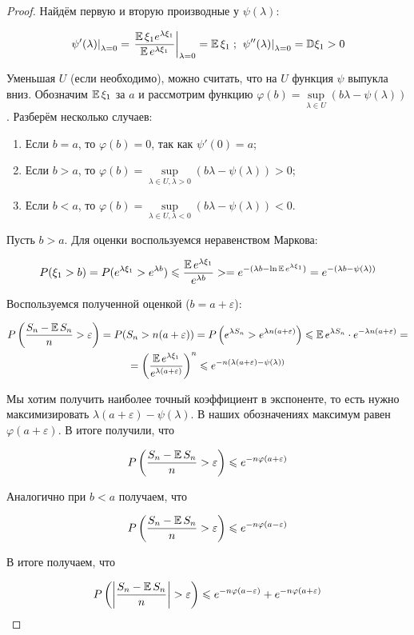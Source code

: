 \begin{proof}
Найдём первую и вторую производные у $\psi(\lambda)$:

\[
\left. \psi'(\lambda) \right|_{\lambda = 0} = 
\left. \frac{\operatorname{\mathbb{E}} \xi_1 e^{\lambda \xi_1}}{\operatorname{\mathbb{E}} e^{\lambda \xi_1}} \right|_{\lambda = 0}
= \operatorname{\mathbb{E}} \xi_1 \; ; \; 
\left. \psi''(\lambda) \right|_{\lambda = 0} = {\mathbb{D}} \xi_1 > 0
\]

Уменьшая $U$ (если необходимо), можно считать, что на $U$ функция $\psi$
выпукла вниз. Обозначим $\operatorname{\mathbb{E}} \xi_1$ за $a$ и рассмотрим функцию
\( \varphi(b) = \sup \limits_{\lambda \in U} (b \lambda - \psi(\lambda)) \). 
Разберём несколько случаев:

\begin{enumerate}
    \item Если \( b = a \), то \( \varphi(b) = 0 \), так как \( \psi'(0) = a \);
    \item Если \( b > a \), то \( \varphi(b) = 
    \sup \limits_{\lambda \in U, \lambda > 0} (b \lambda - \psi(\lambda)) > 0 \);
    \item Если \( b < a \), то \( \varphi(b) = 
    \sup \limits_{\lambda \in U, \lambda < 0} (b \lambda - \psi(\lambda)) < 0 \).
\end{enumerate}

Пусть \( b > a \). Для оценки воспользуемся неравенством Маркова:

\[
P(\xi_1 > b) = P(e^{\lambda \xi_1} > e^{\lambda b}) \leqslant
\frac{\operatorname{\mathbb{E}} e^{\lambda \xi_1}}{e^{\lambda b}}> = 
e^{-(\lambda b - \ln \operatorname{\mathbb{E}} e^{\lambda \xi_1})} = e^{-(\lambda b - \psi(\lambda))}
\]

Воспользуемся полученной оценкой (\( b = a + \varepsilon\)):

\begin{multline*}
P \left( \frac{S_n - \operatorname{\mathbb{E}} S_n}{n} > \varepsilon \right) = 
P(S_n > n(a + \varepsilon)) = 
P \left( e^{\lambda S_n} > e^{\lambda n (a + \varepsilon)} \right) \leqslant
\operatorname{\mathbb{E}} e^{\lambda S_n} \cdot e^{-\lambda n (a + \varepsilon)} = \\
= \left( \frac{\operatorname{\mathbb{E}} e^{\lambda \xi_1}}{e^{\lambda (a + \varepsilon)}} \right)^n
\leqslant e^{-n(\lambda (a + \varepsilon) - \psi(\lambda))}
\end{multline*}

Мы хотим получить наиболее точный коэффициент в экспоненте, то есть нужно
максимизировать \( \lambda (a + \varepsilon) - \psi(\lambda) \). В наших
обозначениях максимум равен \( \varphi(a + \varepsilon) \). В итоге получили, что

\[
P \left( \frac{S_n - \operatorname{\mathbb{E}} S_n}{n} > \varepsilon \right) \leqslant 
e^{-n \varphi(a + \varepsilon)}
\]

Аналогично при \( b < a \) получаем, что

\[
P \left( \frac{S_n - \operatorname{\mathbb{E}} S_n}{n} > \varepsilon \right) \leqslant 
e^{-n \varphi(a - \varepsilon)}
\]

В итоге получаем, что

\[
P \left( \left| \frac{S_n - \operatorname{\mathbb{E}} S_n}{n} \right| > \varepsilon \right) \leqslant
e^{-n \varphi(a - \varepsilon)} + e^{-n \varphi(a + \varepsilon)}
\]

\end{proof}